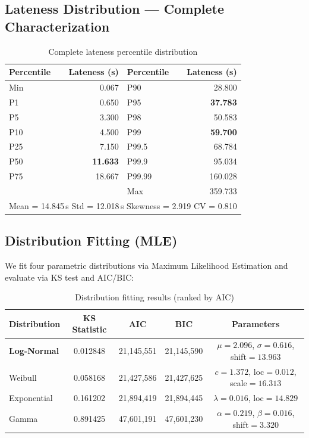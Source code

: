 \documentclass[11pt,a4paper]{article}
\begin{document}
\subsection{Lateness Distribution --- Complete Characterization}

\begin{table}[H]
\centering
\caption{Complete lateness percentile distribution}
\label{tab:lat-percentiles}
\begin{tabular}{lrlr}
\toprule
\textbf{Percentile} & \textbf{Lateness (s)} & \textbf{Percentile} & \textbf{Lateness (s)} \\
\midrule
Min    & 0.067  & P90    & 28.800 \\
P1     & 0.650  & P95    & \textbf{37.783} \\
P5     & 3.300  & P98    & 50.583 \\
P10    & 4.500  & P99    & \textbf{59.700} \\
P25    & 7.150  & P99.5  & 68.784 \\
P50    & \textbf{11.633} & P99.9  & 95.034 \\
P75    & 18.667 & P99.99 & 160.028 \\
       &        & Max    & 359.733 \\
\bottomrule
\multicolumn{4}{c}{Mean = 14.845\,s \quad Std = 12.018\,s \quad Skewness = 2.919 \quad CV = 0.810} \\
\end{tabular}
\end{table}

\subsection{Distribution Fitting (MLE)}

We fit four parametric distributions via Maximum Likelihood Estimation and evaluate via KS test and AIC/BIC:

\begin{table}[H]
\centering
\caption{Distribution fitting results (ranked by AIC)}
\label{tab:dist-fit}
\begin{tabular}{lcccc}
\toprule
\textbf{Distribution} & \textbf{KS Statistic} & \textbf{AIC} & \textbf{BIC} & \textbf{Parameters} \\
\midrule
\textbf{Log-Normal} & 0.012848 & 21,145,551 & 21,145,590 & $\mu{=}2.096$, $\sigma{=}0.616$, shift${=}13.963$ \\
Weibull            & 0.058168 & 21,427,586 & 21,427,625 & $c{=}1.372$, loc${=}0.012$, scale${=}16.313$ \\
Exponential        & 0.161202 & 21,894,419 & 21,894,445 & $\lambda{=}0.016$, loc${=}14.829$ \\
Gamma              & 0.891425 & 47,601,191 & 47,601,230 & $\alpha{=}0.219$, $\beta{=}0.016$, shift${=}3.320$ \\
\bottomrule
\end{tabular}
\end{table}
\end{document}
